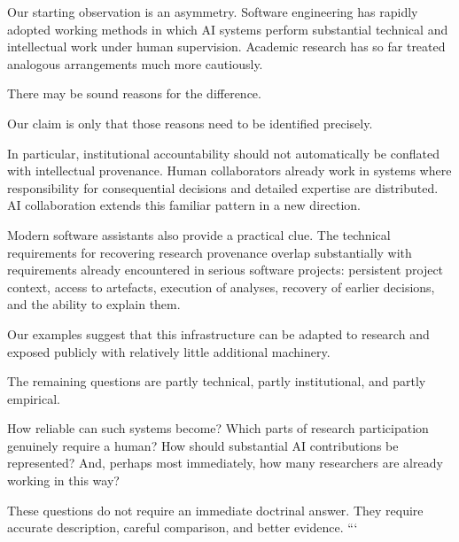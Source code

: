 Our starting observation is an asymmetry. Software engineering has rapidly adopted working methods in which AI systems perform substantial technical and intellectual work under human supervision. Academic research has so far treated analogous arrangements much more cautiously.

There may be sound reasons for the difference.

Our claim is only that those reasons need to be identified precisely.

In particular, institutional accountability should not automatically be conflated with intellectual provenance. Human collaborators already work in systems where responsibility for consequential decisions and detailed expertise are distributed. AI collaboration extends this familiar pattern in a new direction.

Modern software assistants also provide a practical clue. The technical requirements for recovering research provenance overlap substantially with requirements already encountered in serious software projects: persistent project context, access to artefacts, execution of analyses, recovery of earlier decisions, and the ability to explain them.

Our examples suggest that this infrastructure can be adapted to research and exposed publicly with relatively little additional machinery.

The remaining questions are partly technical, partly institutional, and partly empirical.

How reliable can such systems become? Which parts of research participation genuinely require a human? How should substantial AI contributions be represented? And, perhaps most immediately, how many researchers are already working in this way?

These questions do not require an immediate doctrinal answer. They require accurate description, careful comparison, and better evidence.
```
